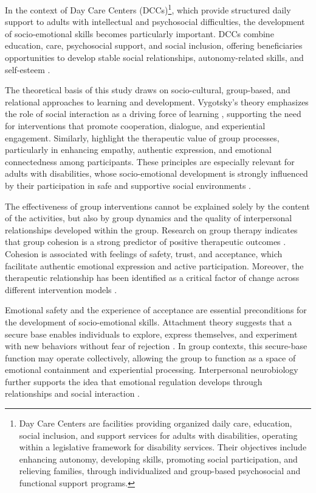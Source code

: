 \documentclass[12pt,a4paper]{article}
\begin{document}
In the context of Day Care Centers (DCCs)\footnote{Day Care Centers are facilities providing organized daily care, education, social inclusion, and support services for adults with disabilities, operating within a legislative framework for disability services. Their objectives include enhancing autonomy, developing skills, promoting social participation, and relieving families, through individualized and group-based psychosocial and functional support programs.}, which provide structured daily support to adults with intellectual and psychosocial difficulties, the development of socio-emotional skills becomes particularly important. DCCs combine education, care, psychosocial support, and social inclusion, offering beneficiaries opportunities to develop stable social relationships, autonomy-related skills, and self-esteem \citep{westmore2024}.

The theoretical basis of this study draws on socio-cultural, group-based, and relational approaches to learning and development. Vygotsky's theory emphasizes the role of social interaction as a driving force of learning \citep{vygotsky1978}, supporting the need for interventions that promote cooperation, dialogue, and experiential engagement. Similarly, \citet{yalom2005} highlight the therapeutic value of group processes, particularly in enhancing empathy, authentic expression, and emotional connectedness among participants. These principles are especially relevant for adults with disabilities, whose socio-emotional development is strongly influenced by their participation in safe and supportive social environments \citep{shogren2017}.

The effectiveness of group interventions cannot be explained solely by the content of the activities, but also by group dynamics and the quality of interpersonal relationships developed within the group. Research on group therapy indicates that group cohesion is a strong predictor of positive therapeutic outcomes \citep{burlingame2011}. Cohesion is associated with feelings of safety, trust, and acceptance, which facilitate authentic emotional expression and active participation. Moreover, the therapeutic relationship has been identified as a critical factor of change across different intervention models \citep{norcross2018,wampold2015}.

Emotional safety and the experience of acceptance are essential preconditions for the development of socio-emotional skills. Attachment theory suggests that a secure base enables individuals to explore, express themselves, and experiment with new behaviors without fear of rejection \citep{bowlby1988}. In group contexts, this secure-base function may operate collectively, allowing the group to function as a space of emotional containment and experiential processing. Interpersonal neurobiology further supports the idea that emotional regulation develops through relationships and social interaction \citep{siegel2012,schore2012}.
\end{document}
